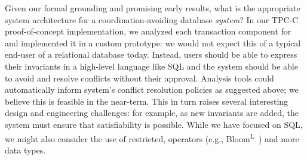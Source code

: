  Given our formal grounding
\iconfluence and promising early results, what is the appropriate
system architecture for a coordination-avoiding database
\textit{system}? In our TPC-C proof-of-concept implementation, we
analyzed each transaction component for \iconfluence and implemented
it in a custom prototype: we would not expect this of a typical
end-user of a relational database today. Instead, users should be able
to express their invariants in a high-level language like SQL and the
system should be able to avoid and resolve conflicts without their
approval. Analysis tools could automatically inform system's conflict
resolution policies as suggested above; we believe this is feasible in
the near-term. This in turn raises several interesting design and
engineering challenges: for example, as new invariants are added, the
system must ensure that satisfiability is possible. While we have
focused on SQL, we might also consider the use of restricted,
\iconfluent operators (e.g., Bloom\textsuperscript{L}~\cite{blooml})
and more data types.

